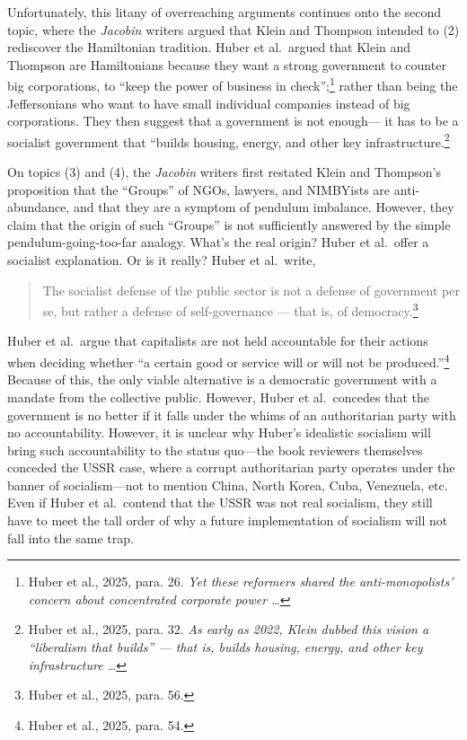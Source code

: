 \documentclass[12pt]{article}
\begin{document}
Unfortunately, this litany of overreaching arguments continues onto the second topic, where the \emph{Jacobin} writers argued that Klein and Thompson intended to (2) rediscover the Hamiltonian tradition. Huber et al.\ argued that Klein and Thompson are Hamiltonians because they want a strong government to counter big corporations, to ``keep the power of business in check'';\footnote{Huber et al., 2025, para. 26. \emph{Yet these reformers shared the anti-monopolists’ concern about concentrated corporate power \dots}} rather than being the Jeffersonians who want to have small individual companies instead of big corporations. They then suggest that a government is not enough--- it has to be a socialist government that ``builds housing, energy, and other key infrastructure.\footnote{Huber et al., 2025, para. 32. \emph{As early as 2022, Klein dubbed this vision a “liberalism that builds” — that is, builds housing, energy, and other key infrastructure \dots}}

On topics (3) and (4), the \emph{Jacobin} writers first restated Klein and Thompson's proposition that the ``Groups'' of NGOs, lawyers, and NIMBYists are anti-abundance, and that they are a symptom of pendulum imbalance. However, they claim that the origin of such ``Groups'' is not sufficiently answered by the simple pendulum-going-too-far analogy. What's the real origin? Huber et al.\ offer a socialist explanation. Or is it really? Huber et al.\ write,

\begin{quotation}
	The socialist defense of the public sector is not a defense of government per se, but rather a defense of self-governance — that is, of democracy.\footnote{Huber et al., 2025, para. 56.}
\end{quotation}

Huber et al.\ argue that capitalists are not held accountable for their actions when deciding whether ``a certain good or service will or will not be produced.''\footnote{Huber et al., 2025, para. 54.} Because of this, the only viable alternative is a democratic government with a mandate from the collective public. However, Huber et al.\ concedes that the government is no better if it falls under the whims of an authoritarian party with no accountability. However, it is unclear why Huber's idealistic socialism will bring such accountability to the status quo---the book reviewers themselves conceded the USSR case, where a corrupt authoritarian party operates under the banner of socialism---not to mention China, North Korea, Cuba, Venezuela, etc. Even if Huber et al.\ contend that the USSR was not real socialism, they still have to meet the tall order of why a future implementation of socialism will not fall into the same trap.
\end{document}
